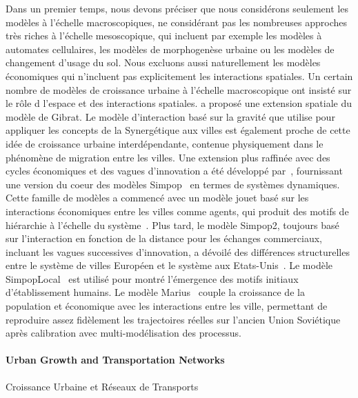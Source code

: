 {Dans un premier temps, nous devons préciser que nous considérons seulement les modèles à l'échelle macroscopiques, ne considérant pas les nombreuses approches très riches à l'échelle mesoscopique, qui incluent par exemple les modèles à automates cellulaires, les modèles de morphogenèse urbaine ou les modèles de changement d'usage du sol. Nous excluons aussi naturellement les modèles économiques qui n'incluent pas explicitement les interactions spatiales. Un certain nombre de modèles de croissance urbaine à l'échelle macroscopique ont insisté sur le rôle d l'espace et des interactions spatiales. \cite{bretagnolle2000long} a proposé une extension spatiale du modèle de Gibrat. Le modèle d'interaction basé sur la gravité que \cite{sanders1992systeme} utilise pour appliquer les concepts de la Synergétique aux villes est également proche de cette idée de croissance urbaine interdépendante, contenue physiquement dans le phénomène de migration entre les villes. Une extension plus raffinée avec des cycles économiques et des vagues d'innovation a été développé par~\cite{favaro2011gibrat}, fournissant une version du coeur des modèles Simpop~\cite{pumain2012multi} en termes de systèmes dynamiques. Cette famille de modèles a commencé avec un modèle jouet basé sur les interactions économiques entre les villes comme agents, qui produit des motifs de hiérarchie à l'échelle du système~\cite{sanders1997simpop}. Plus tard, le modèle Simpop2, toujours basé sur l'interaction en fonction de la distance pour les échanges commerciaux, incluant les vagues successives d'innovation, a dévoilé des différences structurelles entre le système de villes Européen et le système aux Etats-Unis~\cite{bretagnolle2010comparer}. Le modèle SimpopLocal~\cite{pumain2017simpoplocal} est utilisé pour montré l'émergence des motifs initiaux d'établissement humains. Le modèle Marius~\cite{cottineau2014evolution} couple la croissance de la population et économique avec les interactions entre les ville, permettant de reproduire assez fidèlement les trajectoires réelles sur l'ancien Union Soviétique après calibration avec multi-modélisation des processus.
}


\paragraph{Urban Growth and Transportation Networks}{Croissance Urbaine et Réseaux de Transports}



